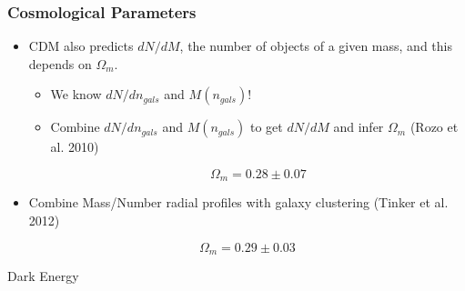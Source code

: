 \documentclass{beamer}
\begin{document}
\frame
{
    \frametitle{Cosmological Parameters}
    \begin{itemize}

        \item CDM also predicts $dN/dM$, the number of objects of a given mass, and
            this depends on {\color{gold} $\Omega_m$}.

            \begin{itemize}
                \item We know $dN/dn_{gals}$ and $M(n_{gals})$!

                \item Combine  $dN/dn_{gals}$ and $M(n_{gals})$ to get $dN/dM$ and infer
                    $\Omega_m$
                    (Rozo et al. 2010)

                    {\color{gold}
                        \begin{equation}
                            \Omega_m = 0.28 \pm 0.07 \nonumber
                        \end{equation}
                    }
            \end{itemize}

        \item Combine Mass/Number radial profiles with galaxy clustering 
            (Tinker et al. 2012)

            {\color{gold}
                \begin{equation}
                    \Omega_m = 0.29 \pm 0.03 \nonumber
                \end{equation}
            }


    \end{itemize}
}

\frame
{

    {\Huge Dark Energy }

}
\end{document}
